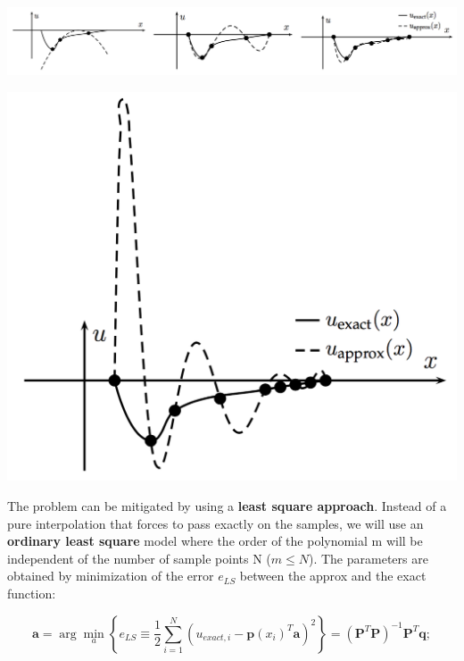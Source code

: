 	\begin{center}
	\begin{minipage}{0.55\textwidth}
	\includegraphics[scale=0.3]{ch5/1}
	\end{minipage}
	\begin{minipage}{0.4\textwidth}
	\includegraphics[scale=0.3]{ch5/2}
	\end{minipage}
	\end{center}
	
	The problem can be mitigated by using a \textbf{least square approach}. Instead of a pure interpolation that forces to pass exactly on the samples, we will use an \textbf{ordinary least square} model where the order of the polynomial m will be independent of the number of sample points N ($m\leq N$). The parameters are obtained by minimization of the error $e_{LS}$ between the approx and the exact function: 
	
	\begin{equation}
	\bm{a} = \arg \min _a \left\{ e_{LS} \equiv \frac{1}{2}\sum _{i=1}^N \left(u_{exact,i}-\bm{p}(x_i)^T\bm{a}\right)^2 \right\} = \left( \bm{P}^T\bm{P} \right)^{-1} \bm{P}^T \bm{q};
	\end{equation}
	
